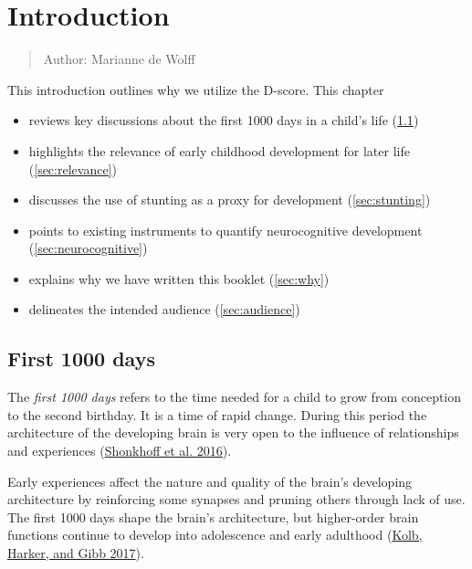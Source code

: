 \documentclass[
]{book}
\providecommand{\tightlist}{%
  \setlength{\itemsep}{0pt}\setlength{\parskip}{0pt}}
\begin{document}
\hypertarget{intro}{%
\chapter{Introduction}\label{intro}}

\begin{quote}
Author: Marianne de Wolff
\end{quote}

This introduction outlines why we utilize the D-score. This chapter

\begin{itemize}
\tightlist
\item
  reviews key discussions about the first 1000 days in a child's life (\ref{sec:first1000})
\item
  highlights the relevance of early childhood development for later life (\ref{sec:relevance})
\item
  discusses the use of stunting as a proxy for development (\ref{sec:stunting})
\item
  points to existing instruments to quantify neurocognitive development (\ref{sec:neurocognitive})
\item
  explains why we have written this booklet (\ref{sec:why})
\item
  delineates the intended audience (\ref{sec:audience})
\end{itemize}

\hypertarget{sec:first1000}{%
\section{First 1000 days}\label{sec:first1000}}

The \emph{first 1000 days} refers to the time needed for a child to grow from conception to the second birthday. It is a time of rapid change. During this period the architecture of the developing brain is very open to the influence of relationships and experiences (\protect\hyperlink{ref-skonkhoff2016best}{Shonkhoff et al. 2016}).

Early experiences affect the nature and quality of the brain's developing architecture by reinforcing some synapses and pruning others through lack of use. The first 1000 days shape the brain's architecture, but higher-order brain functions continue to develop into adolescence and early adulthood (\protect\hyperlink{ref-kolb2017principles}{Kolb, Harker, and Gibb 2017}).
\end{document}
